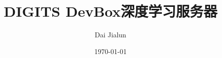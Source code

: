 

\title{\vspace{-2em} DIGITS DevBox深度学习服务器\\
\normalsize{}}
\author{Dai Jialun}
\date{\vspace{-0.7em} \today \vspace{-0.7em}}
\maketitle\thispagestyle{fancy}
\maketitle
